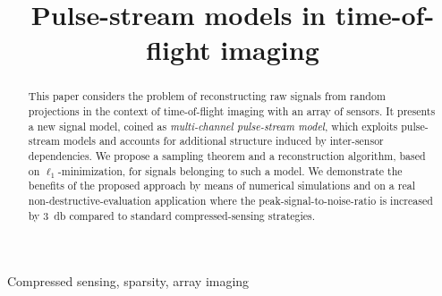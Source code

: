 \documentclass{article}
\theoremstyle{definition}
\begin{document}
\ninept
%
\title{Pulse-stream models in time-of-flight imaging}
%
%

\maketitle

\begin{abstract}
	This paper considers the problem of reconstructing raw signals from random projections in the context of time-of-flight imaging with an array of sensors. It presents a new signal model, coined as \textit{multi-channel pulse-stream model}, which exploits pulse-stream models and accounts for additional structure induced by inter-sensor dependencies. We propose a sampling theorem and a reconstruction algorithm, based on $\ell_1$-minimization, for signals belonging to such a model. We demonstrate the benefits of the proposed approach by means of numerical simulations and on a real non-destructive-evaluation application where the peak-signal-to-noise-ratio is increased by \SI{3}{\decibel} compared to standard compressed-sensing strategies. 
\end{abstract}

\begin{keywords}
Compressed sensing, sparsity, array imaging
\end{keywords}






%
\maketitle
\end{document}

